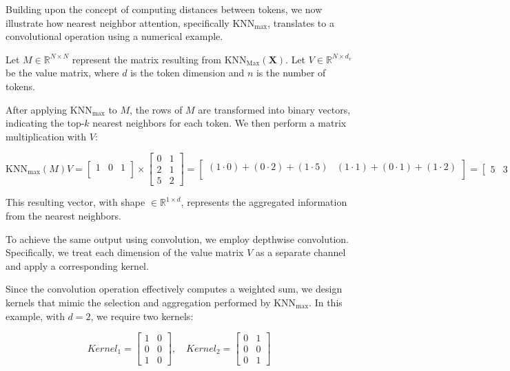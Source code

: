 \documentclass{article}
\begin{document}
Building upon the concept of computing distances between tokens, we now illustrate how nearest neighbor attention, specifically $\text{KNN}_{\text{max}}$, translates to a convolutional operation using a numerical example.

Let $M \in \mathbb{R}^{N \times N}$ represent the matrix resulting from $\text{KNN}_{\text{Max}}(\mathbf{X})$. Let $V \in \mathbb{R}^{N \times d_v}$ be the value matrix, where $d$ is the token dimension and $n$ is the number of tokens.

After applying $\text{KNN}_{\text{max}}$ to $M$, the rows of $M$ are transformed into binary vectors, indicating the top-$k$ nearest neighbors for each token. We then perform a matrix multiplication with $V$:

\[
\text{KNN}_{\text{max}}(M)V =
\begin{bmatrix}
1 & 0 & 1 \\
\end{bmatrix}
\times
\begin{bmatrix}
0 & 1 \\
2 & 1 \\
5 & 2
\end{bmatrix}
=
\begin{bmatrix}
(1 \cdot 0) + (0 \cdot 2) + (1 \cdot 5) & (1 \cdot 1) + (0 \cdot 1) + (1 \cdot 2) \\
\end{bmatrix}
=
\begin{bmatrix}
5 & 3
\end{bmatrix}
\]

This resulting vector, with shape $\in \mathbb{R}^{1 \times d}$, represents the aggregated information from the nearest neighbors.

To achieve the same output using convolution, we employ depthwise convolution. Specifically, we treat each dimension of the value matrix $V$ as a separate channel and apply a corresponding kernel.

Since the convolution operation effectively computes a weighted sum, we design kernels that mimic the selection and aggregation performed by $\text{KNN}_{\text{max}}$. In this example, with $d=2$, we require two kernels:

\[
Kernel_1 =
\begin{bmatrix}
1 & 0 \\
0 & 0 \\
1 & 0
\end{bmatrix}
, \quad
Kernel_2 =
\begin{bmatrix}
0 & 1 \\
0 & 0 \\
0 & 1
\end{bmatrix}
\]
\end{document}
